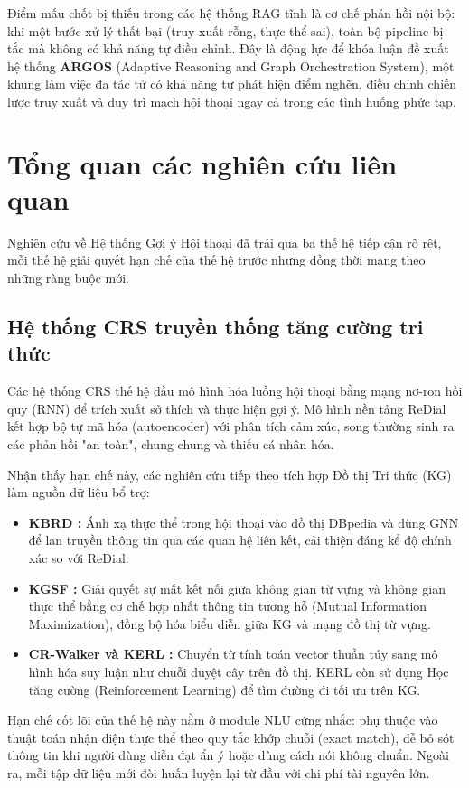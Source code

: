 Điểm mấu chốt bị thiếu trong các hệ thống RAG tĩnh là cơ chế phản hồi nội bộ: khi một bước xử lý thất bại (truy xuất rỗng, thực thể sai), toàn bộ pipeline bị tắc mà không có khả năng tự điều chỉnh. Đây là động lực để khóa luận đề xuất hệ thống \textbf{ARGOS} (Adaptive Reasoning and Graph Orchestration System), một khung làm việc đa tác tử có khả năng tự phát hiện điểm nghẽn, điều chỉnh chiến lược truy xuất và duy trì mạch hội thoại ngay cả trong các tình huống phức tạp.

\section{Tổng quan các nghiên cứu liên quan}

Nghiên cứu về Hệ thống Gợi ý Hội thoại đã trải qua ba thế hệ tiếp cận rõ rệt, mỗi thế hệ giải quyết hạn chế của thế hệ trước nhưng đồng thời mang theo những ràng buộc mới.

\subsection{Hệ thống CRS truyền thống tăng cường tri thức}
Các hệ thống CRS thế hệ đầu mô hình hóa luồng hội thoại bằng mạng nơ-ron hồi quy (RNN) để trích xuất sở thích và thực hiện gợi ý. Mô hình nền tảng ReDial \cite{li2018towards} kết hợp bộ tự mã hóa (autoencoder) với phân tích cảm xúc, song thường sinh ra các phản hồi "an toàn", chung chung và thiếu cá nhân hóa.

Nhận thấy hạn chế này, các nghiên cứu tiếp theo tích hợp Đồ thị Tri thức (KG) làm nguồn dữ liệu bổ trợ:
\begin{itemize}
    \item \textbf{KBRD \cite{chen-etal-2019-towards}:} Ánh xạ thực thể trong hội thoại vào đồ thị DBpedia và dùng GNN để lan truyền thông tin qua các quan hệ liên kết, cải thiện đáng kể độ chính xác so với ReDial.
    \item \textbf{KGSF \cite{zhou2020improvingcrs}:} Giải quyết sự mất kết nối giữa không gian từ vựng và không gian thực thể bằng cơ chế hợp nhất thông tin tương hỗ (Mutual Information Maximization), đồng bộ hóa biểu diễn giữa KG và mạng đồ thị từ vựng.
    \item \textbf{CR-Walker \cite{ma2021crwalker} và KERL \cite{Qiu_2025}:} Chuyển từ tính toán vector thuần túy sang mô hình hóa suy luận như chuỗi duyệt cây trên đồ thị. KERL còn sử dụng Học tăng cường (Reinforcement Learning) để tìm đường đi tối ưu trên KG.
\end{itemize}
Hạn chế cốt lõi của thế hệ này nằm ở module NLU cứng nhắc: phụ thuộc vào thuật toán nhận diện thực thể theo quy tắc khớp chuỗi (exact match), dễ bỏ sót thông tin khi người dùng diễn đạt ẩn ý hoặc dùng cách nói không chuẩn. Ngoài ra, mỗi tập dữ liệu mới đòi huấn luyện lại từ đầu với chi phí tài nguyên lớn.

